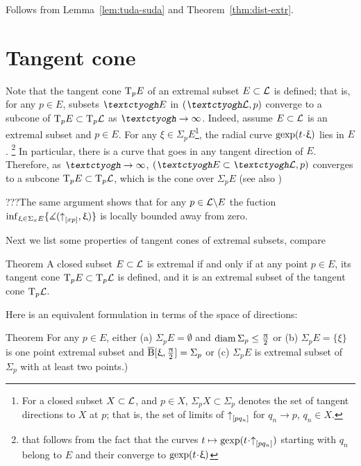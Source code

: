 Follows from Lemma~\ref{lem:tuda-suda} 
and Theorem~\ref{thm:dist-extr}.\qeds

\section{Tangent cone}

Note that the tangent cone \label{T_pE}$\text{\rm T}_p E$ of an extremal subset $E\subset \spc{L}$ is defined; 
that is,
for any $p\in E$, subsets $\lam E$ in $(\lam \spc{L},p)$ converge to a subcone of $\T_p E\subset \T_p \spc{L}$ as
$\lam\to\infty$.
Indeed, assume $E\subset \spc{L}$ is an extremal subset and $p\in E$.
For any $\xi\in \Sigma_p E$\footnote{\label{U_pX}For a closed subset $X\subset \spc{L}$, and $p\in X$, $\Sigma_p X\subset \Sigma_p$ denotes the set of tangent directions to $X$ at $p$; that is, the
set of limits of ${\uparrow}_{[{p}{q_n}]}$ for $q_n\to p$, $q_n\in X$.}, the radial curve $\gexp(t\cdot\xi)$ lies in $E$.%
\footnote{that follows from the fact that the curves 
$t\mapsto\gexp(t\cdot\dir p{q_n})$ starting with $q_n$ belong to $E$
and their converge to $\gexp(t\cdot\xi)$} 
In particular, there is a curve that goes in any tangent direction of $E$.
Therefore, as $\lam\to\infty$,  $(\lam E\subset \lam \spc{L},p)$ converges to
a subcone $\T_p E\subset \T_p \spc{L}$, which is the cone over $\Sigma_p E$ (see also
\cite[3.3]{perelman-petrunin:extremal})

???The same argument shows that for any $p\in \spc{L}\backslash E$ the fuction $\inf_{\xi\in\Sigma_xE}\{\mangle(\dir x p,\xi)\}$ is locally bounded away from zero.

Next we list some properties of tangent cones of extremal subsets, compare
\cite[1.4]{perelman-petrunin:extremal}

\begin{thm}{Theorem}
\label{ext-tangent} A closed subset $E\subset \spc{L}$ is  extremal if and only if 
at any point $p\in E$, its tangent cone $\T_p E\subset \T_p \spc{L}$ is defined,
and it is an extremal subset of the tangent cone $\text{\rm T}_p \mathcal{L}$.
\end{thm}

Here is an equivalent formulation in terms of the space of directions: 

\begin{thm}{Theorem}
For any $p\in E$,
either 
(a) $\Sigma_p E=\emptyset$ and $\diam \Sigma_p\le\tfrac\pi2$ or 
(b) $\Sigma_p E=\{\xi\}$ is one point extremal subset and $\overline{\mathrm{B}}{}[\upxi,\tfrac{\uppi}2]=\Sigma_p$
or
(c) $\Sigma_p E$ is extremal subset of $\Sigma_p$ with at least two points.)
\end{thm}


